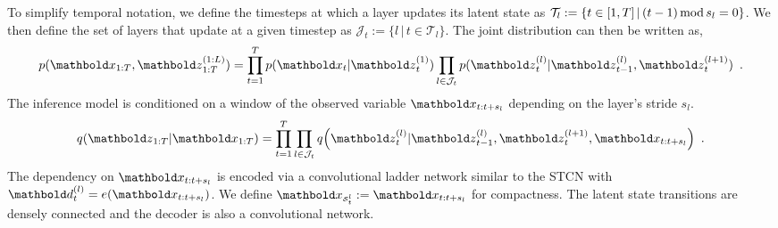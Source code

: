 {To simplify temporal notation, we define the timesteps at which a layer updates its latent state as $\mathcal{T}_l := \{t \in {\left[1,T\right]} \,|\, (t-1)\,\text{mod}\, s_l = 0\}$. We then define the set of layers that update at a given timestep as $\mathcal{J}_t := \{ l \,|\, t\in\mathcal{T}_l \}$. The joint distribution can then be written as,
\begin{equation}
    p(\xb_{1:T},\zb_{1:T}^{(1:L)}) = 
    \prod_{t=1}^{T} p(\xb_t | \zb_t^{(1)})
    \prod\limits_{l\in\mathcal{J}_t} p(\zb_t^{(l)} | \zb_{t-1}^{(l)}, \zb_t^{(l+1)}) \enspace . \nonumber
    \label{eq: cwvae joint}
\end{equation}
The inference model is conditioned on a window of the observed variable $\xb_{t:t+s_l}$ depending on the layer's stride $s_l$.
\begin{equation}
    q\pa{\zb_{1:T} | \xb_{1:T}} = \prod_{t=1}^T \prod\limits_{l\in\mathcal{J}_t} q\pa{\zb_t^{(l)} | \zb_{t-1}^{(l)}, \zb_t^{(l+1)}, \xb_{t:t+s_l}} \enspace . \nonumber
    \label{eq: cwvae inference}
\end{equation}
The dependency on $\xb_{t:t+s_l}$ is encoded via a convolutional ladder network similar to the STCN with $\db_t^{(l)} = e(\xb_{t:t+s_l})$. We define $\xb_{\scriptscriptstyle\mathcal{S}_t^l}:=\xb_{t:t+s_l}$ for compactness. The latent state transitions are densely connected and the decoder is also a convolutional network. 
}
